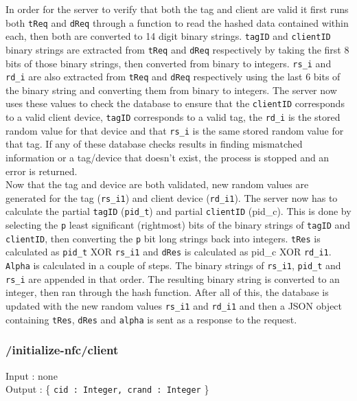 In order for the server to verify that both the tag and client are valid it first runs both \verb|tReq| and \verb|dReq| through a function to read the hashed data contained within each, then both are converted to 14 digit binary strings. \verb|tagID| and \verb|clientID| binary strings are extracted from \verb|tReq| and \verb|dReq| respectively by taking the first 8 bits of those binary strings, then converted from binary to integers. \verb|rs_i| and\verb| rd_i| are also extracted from \verb|tReq| and \verb|dReq| respectively using the last 6 bits of the binary string and converting them from binary to integers. The server now uses these values to check the database to ensure that the \verb|clientID| corresponds to a valid client device, \verb|tagID| corresponds to a valid tag, the \verb|rd_i| is the stored random value for that device and that \verb|rs_i| is the same stored random value for that tag. If any of these database checks results in finding mismatched information or a tag/device that doesn’t exist, the process is stopped and an error is returned.\\
 
Now that the tag and device are both validated, new random values are generated for the tag (\verb|rs_i1|) and client device (\verb|rd_i1|). The server now has to calculate the partial \verb|tagID| (\verb|pid_t|) and partial \verb|clientID| (pid\_c). This is done by selecting the \verb|p| least significant (rightmost) bits of the binary strings of \verb|tagID| and \verb|clientID|, then converting the \verb|p| bit long strings back into integers. \verb|tRes| is calculated as \verb|pid_t| XOR \verb|rs_i1| and \verb|dRes| is calculated as pid\_c XOR \verb|rd_i1|. \verb|Alpha| is calculated in a couple of steps. The binary strings of \verb|rs_i1|, \verb|pid_t| and \verb|rs_i| are appended in that order. The resulting binary string is converted to an integer, then ran through the hash function. After all of this, the database is updated with the new random values \verb|rs_i1| and \verb|rd_i1| and then a JSON object containing \verb|tRes|, \verb|dRes| and \verb|alpha| is sent as a response to the request.
 
\subsubsection{/initialize-nfc/client}
 
Input : none\\
Output : \{ \verb|cid : Integer, crand : Integer| \}\\
 
